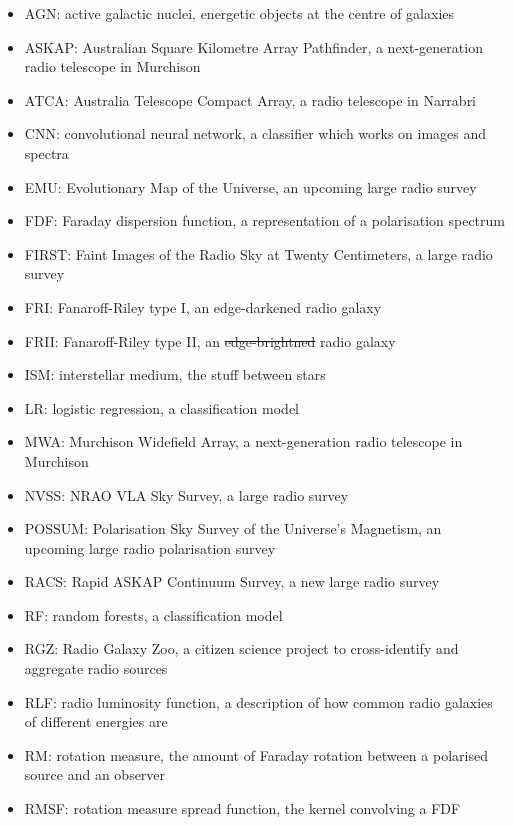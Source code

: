 \documentclass[11pt, a4paper]{book}
\providecommand{\DIFaddtex}[1]{{\protect\color{blue}\uwave{#1}}} %
\providecommand{\DIFdeltex}[1]{{\protect\color{red}\sout{#1}}}                      %
\providecommand{\DIFaddbegin}{} %
\providecommand{\DIFaddend}{} %
\providecommand{\DIFdelbegin}{} %
\providecommand{\DIFdelend}{} %
\providecommand{\DIFadd}[1]{\texorpdfstring{\DIFaddtex{#1}}{#1}} %
\providecommand{\DIFdel}[1]{\texorpdfstring{\DIFdeltex{#1}}{}} %
\newcommand{\DIFscaledelfig}{0.5}
\newlength{\DIFdelgraphicswidth} %
\newlength{\DIFdelgraphicsheight} %
\newcommand{\DIFaddincludegraphics}[2][]{{\color{blue}\fbox{\DIFOincludegraphics[#1]{#2}}}} %
\newcommand{\DIFdelincludegraphics}[2][]{%
\sbox{\DIFdelgraphicsbox}{\DIFOincludegraphics[#1]{#2}}%
\settoboxwidth{\DIFdelgraphicswidth}{\DIFdelgraphicsbox} %
\settoboxtotalheight{\DIFdelgraphicsheight}{\DIFdelgraphicsbox} %
\scalebox{\DIFscaledelfig}{%
\parbox[b]{\DIFdelgraphicswidth}{\usebox{\DIFdelgraphicsbox}\\[-\baselineskip] \rule{\DIFdelgraphicswidth}{0em}}\llap{\resizebox{\DIFdelgraphicswidth}{\DIFdelgraphicsheight}{%
\setlength{\unitlength}{\DIFdelgraphicswidth}%
\begin{picture}(1,1)%
\thicklines\linethickness{2pt} %
{\color[rgb]{1,0,0}\put(0,0){\framebox(1,1){}}}%
{\color[rgb]{1,0,0}\put(0,0){\line( 1,1){1}}}%
{\color[rgb]{1,0,0}\put(0,1){\line(1,-1){1}}}%
\end{picture}%
}\hspace*{3pt}}} %
} %
\DeclareRobustCommand{\DIFaddbegin}{\DIFOaddbegin \let\includegraphics\DIFaddincludegraphics} %
\DeclareRobustCommand{\DIFaddend}{\DIFOaddend \let\includegraphics\DIFOincludegraphics} %
\DeclareRobustCommand{\DIFdelbegin}{\DIFOdelbegin \let\includegraphics\DIFdelincludegraphics} %
\DeclareRobustCommand{\DIFdelend}{\DIFOaddend \let\includegraphics\DIFOincludegraphics} %
\begin{document}
\begin{itemize}
    \item AGN: active galactic nuclei, energetic objects at the centre of galaxies
    \item ASKAP: Australian Square Kilometre Array Pathfinder, a next-generation radio telescope in Murchison
    \item ATCA: Australia Telescope Compact Array, a radio telescope in Narrabri
    \item CNN: convolutional neural network, a classifier which works on images and spectra
    \item EMU: Evolutionary Map of the Universe, an upcoming large radio survey
    \item FDF: Faraday dispersion function, a representation of a polarisation spectrum
    \item FIRST: Faint Images of the Radio Sky at Twenty Centimeters, a large radio survey
    \item FRI: Fanaroff-Riley type I, an edge-darkened radio galaxy
    \item FRII: Fanaroff-Riley type II, an \DIFdelbegin \DIFdel{edge-brightned }\DIFdelend \DIFaddbegin \DIFadd{edge-brightened }\DIFaddend radio galaxy
    \item ISM: interstellar medium, the stuff between stars
    \item LR: logistic regression, a classification model
    \item MWA: Murchison Widefield Array, a next-generation radio telescope in Murchison
    \item NVSS: NRAO VLA Sky Survey, a large radio survey
    \item POSSUM: Polarisation Sky Survey of the Universe's Magnetism, an upcoming large radio polarisation survey
    \item RACS: Rapid ASKAP Continuum Survey, a new large radio survey
    \item RF: random forests, a classification model
    \item RGZ: Radio Galaxy Zoo, a citizen science project to cross-identify and aggregate radio sources
    \item RLF: radio luminosity function, a description of how common radio galaxies of different energies are
    \item RM: rotation measure, the amount of Faraday rotation between a polarised source and an observer
    \item RMSF: rotation measure spread function, the kernel convolving a FDF

\end{itemize}
\end{document}
